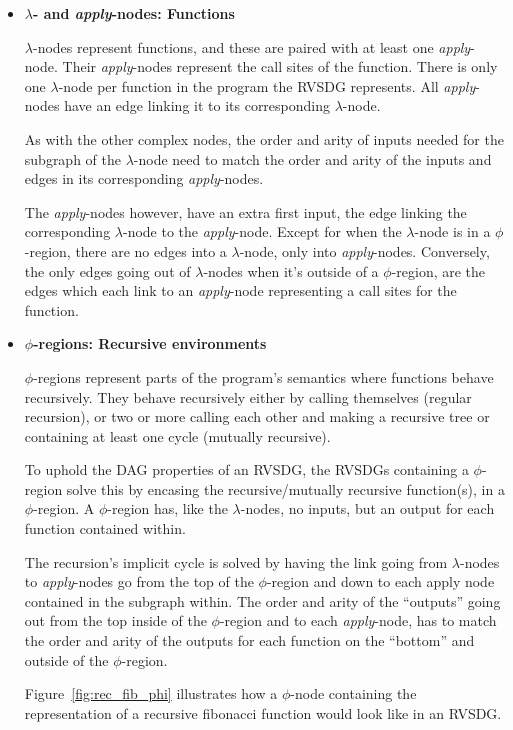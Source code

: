 \begin{itemize}
\clearpage
\item \textbf{$\lambda$- and \textit{apply}-nodes: Functions}

\textit{$\lambda$}-nodes represent functions, and these are paired with at least
one \textit{apply}-node. Their \textit{apply}-nodes represent the call sites of
the function. There is only one $\lambda$-node per function in the program the
RVSDG represents. All \textit{apply}-nodes have an edge linking it to its
corresponding $\lambda$-node.

As with the other complex nodes, the order and arity of inputs needed for the
subgraph of the $\lambda$-node need to match the order and arity of the inputs
and edges in its corresponding \textit{apply}-nodes.

The \textit{apply}-nodes however, have an extra first input, the edge linking
the corresponding $\lambda$-node to the \textit{apply}-node. Except for when the
$\lambda$-node is in a $\phi$-region, there are no edges into a $\lambda$-node,
only into \textit{apply}-nodes. Conversely, the only edges going out of
$\lambda$-nodes when it's outside of a $\phi$-region, are the edges which each
link to an \textit{apply}-node representing a call sites for the function.

\item \textbf{$\phi$-regions: Recursive environments}

\textit{$\phi$}-regions represent parts of the program's semantics where
functions behave recursively. They behave recursively either by calling
themselves (regular recursion), or two or more calling each other and making a
recursive tree or containing at least one cycle (mutually recursive).

To uphold the DAG properties of an RVSDG, the RVSDGs containing a $\phi$-region
solve this by encasing the recursive/mutually recursive function(s), in a
$\phi$-region. A $\phi$-region has, like the $\lambda$-nodes, no inputs, but an
output for each function contained within.

The recursion's implicit cycle is solved by having the link going from
$\lambda$-nodes to  \textit{apply}-nodes go from the top of the $\phi$-region
and down to each apply node contained in the subgraph within. The order and
arity of the ``outputs'' going out from the top inside of the $\phi$-region and
to each \textit{apply}-node, has to match the order and arity of the outputs for
each function on the ``bottom'' and outside of the $\phi$-region.

Figure~\ref{fig:rec_fib_phi} illustrates how a $\phi$-node containing the
representation of a recursive fibonacci function would look like in an RVSDG.

\end{itemize}

